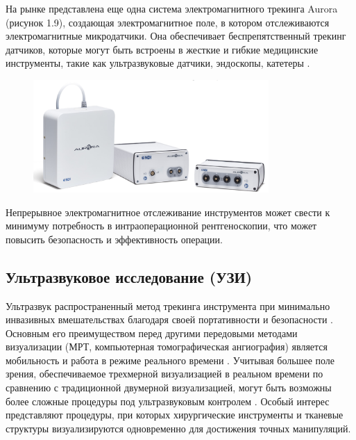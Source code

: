 На рынке представлена еще одна система электромагнитного трекинга Aurora (рисунок 1.9), создающая электромагнитное поле, в котором отслеживаются электромагнитные микродатчики. Она обеспечивает беспрепятственный трекинг датчиков, которые могут быть встроены в жесткие и гибкие медицинские инструменты, такие как ультразвуковые датчики, эндоскопы, катетеры \cite{litlink27}.

\begin{figure}[!h]
\begin{center}
\includegraphics[width=0.8\textwidth]{Рисунки/Аврора.png}
\caption{\centering {}}
\label{част}
\end{center}
\end{figure}

Непрерывное электромагнитное отслеживание инструментов может свести к минимуму потребность в интраоперационной рентгеноскопии, что может повысить безопасность и эффективность операции.

\subsection{Ультразвуковое исследование (УЗИ)}

Ультразвук распространенный метод трекинга инструмента при минимально инвазивных вмешательствах благодаря своей портативности и безопасности \cite{litlink28}. Основным его преимуществом перед другими передовыми методами визуализации (МРТ, компьютерная томографическая ангиография) является мобильность и работа в режиме реального времени \cite{litlink29}. Учитывая большее поле зрения, обеспечиваемое трехмерной визуализацией в реальном времени по сравнению с традиционной двумерной визуализацией, могут быть возможны более сложные процедуры под ультразвуковым контролем \cite{litlink30}. Особый интерес представляют процедуры, при которых хирургические инструменты и тканевые структуры визуализируются одновременно для достижения точных манипуляций.

